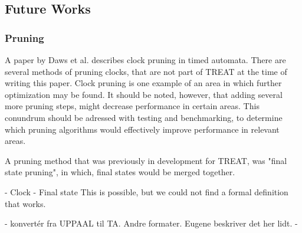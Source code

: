 \subsection{Future Works}\label{subsec:futureWorks}


\subsubsection{Pruning}\label{futureWorks:pruning}
A paper by Daws et al. \cite{Daws1996} describes clock pruning in timed automata. There are several methods of pruning clocks, that are not part of TREAT at the time of writing this paper.
Clock pruning is one example of an area in which further optimization may be found. It should be noted, however, that adding several more pruning steps, might decrease performance in certain areas.
This conundrum should be adressed with testing and benchmarking, to determine which pruning algorithms would effectively improve performance in relevant areas.

A pruning method that was previously in development for TREAT, was "final state pruning", in which, final states would be merged together.



- Clock
- Final state
This is possible, but we could not find a formal definition that works.
\cite{Daws1996}



- konvertér fra UPPAAL til TA. Andre formater. Eugene beskriver det her lidt.
- 
